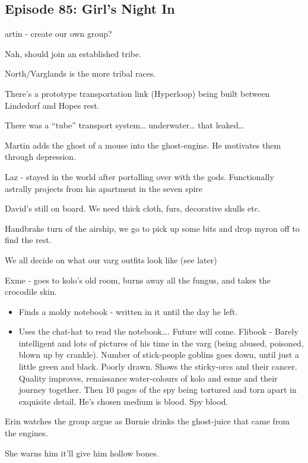 \subsection{Episode 85: Girl's Night In}

artin - create our own group?\medskip

Nah, should join an established tribe.\medskip

North/Varglands is the more tribal races.\medskip

There’s a prototype transportation link (Hyperloop) being built between Lindedorf and Hopes rest.\medskip

There was a “tube” transport system… underwater… that leaked…\medskip

Martin adds the ghost of a mouse into the ghost-engine. He motivates them through depression.\medskip

Laz - stayed in the world after portalling over with the gods. Functionally astrally projects from his apartment in the seven spire\medskip

David’s still on board. We need thick cloth, furs, decorative skulls etc.\medskip

Handbrake turn of the airship, we go to pick up some bits and drop myron off to find the rest.\medskip

We all decide on what our varg outfits look like (see later)\medskip

Exme - goes to kolo’s old room, burns away all the fungus, and takes the crocodile skin.\medskip

\begin{itemize}
  \item Finds a moldy notebook - written in it until the day he left.
  \item Uses the chat-hat to read the notebook…. Future will come. Flibook - Barely intelligent and lots of pictures of his time in the varg (being abused, poisoned, blown up by crankle). Number of stick-people goblins goes down, until just a little green and black. Poorly drawn. Shows the sticky-orcs and their cancer. Quality improves, renaissance water-colours of kolo and esme and their journey together. Then 10 pages of the spy being tortured and torn apart in exquisite detail. He’s chosen medium is blood. Spy blood.
\end{itemize}

Erin watches the group argue as Burnie drinks the ghost-juice that came from the engines.\medskip

She warns him it’ll give him hollow bones.\medskip

